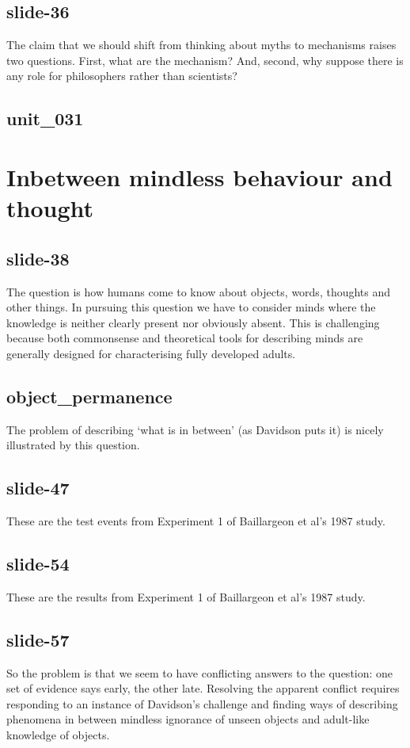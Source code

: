 \documentclass[12pt,\papersize]{extarticle}
\begin{document}
 
\subsection{slide-36}
The claim that we should shift from thinking about myths to mechanisms raises two questions.
First, what are the mechanism?
And, second, why suppose there is any role for philosophers rather than scientists?
 
 
\subsection{unit\_031}
 
\section{Inbetween mindless behaviour and thought}
 
 
\subsection{slide-38}
The question is how humans come to know about objects, words, thoughts and other things.
In pursuing this question we have to consider minds where the knowledge is neither clearly present nor obviously absent.
This is challenging because both commonsense and theoretical tools for describing minds are generally designed for characterising fully developed adults.
 
 
\subsection{object\_permanence}
The problem of describing ‘what is in between' (as Davidson puts it) is nicely illustrated by this question.
 
 
\subsection{slide-47}
These are the test events from Experiment 1 of Baillargeon et al's 1987 study.
 
 
\subsection{slide-54}
These are the results from Experiment 1 of Baillargeon et al's 1987 study.
 
 
\subsection{slide-57}
So the problem is that we seem to have conflicting answers to the question: one set of evidence says early, the other late.
Resolving the apparent conflict requires responding to an instance of Davidson's challenge and finding ways of describing phenomena in between mindless ignorance of unseen objects and adult-like knowledge of objects.
 
\end{document}
